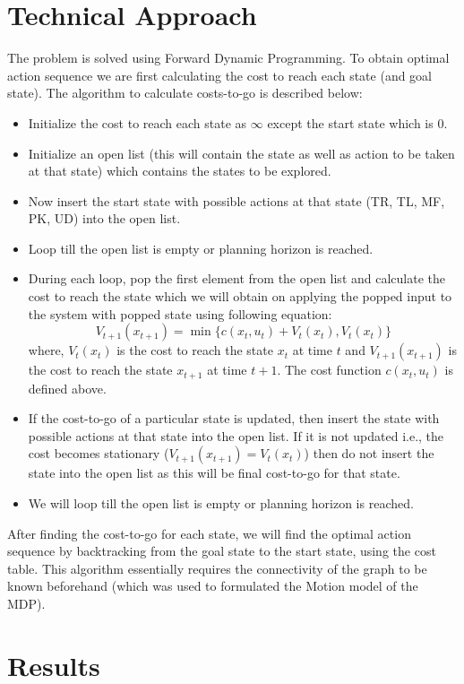 \documentclass[conference]{IEEEtran}
\begin{document}
\section{Technical Approach}
The problem is solved using Forward Dynamic Programming. To obtain optimal action sequence we are first calculating the cost to reach each state (and goal state). The algorithm to calculate costs-to-go is described below:
\begin{itemize}
\item Initialize the cost to reach each state as $\infty$ except the start state which is 0.
\item Initialize an open list (this will contain the state as well as action to be taken at that state) which contains the states to be explored.
\item Now insert the start state with possible actions at that state (TR, TL, MF, PK, UD) into the open list.
\item Loop till the open list is empty or planning horizon is reached.
\item During each loop, pop the first element from the open list and calculate the cost to reach the state which we will obtain on applying the popped input to the system with popped state using following equation:
\begin{equation*}
    V_{t+1}(x_{t+1}) = \min \{c(x_t, u_t) + V_t(x_t), V_t(x_t)\}
\end{equation*}
where, $V_t(x_t)$ is the cost to reach the state $x_t$ at time $t$ and $V_{t+1}(x_{t+1})$ is the cost to reach the state $x_{t+1}$ at time $t+1$. The cost function $c(x_t, u_t)$ is defined above.
\item If the cost-to-go of a particular state is updated, then insert the state with possible actions at that state into the open list. If it is not updated i.e., the cost becomes stationary ($V_{t+1}(x_{t+1})=V_t(x_t)$) then do not insert the state into the open list as this will be final cost-to-go for that state.
\item We will loop till the open list is empty or planning horizon is reached.
\end{itemize}
After finding the cost-to-go for each state, we will find the optimal action sequence by backtracking from the goal state to the start state, using the cost table. This algorithm essentially requires the connectivity of the graph to be known beforehand (which was used to formulated the Motion model of the MDP).

\section{Results}
\end{document}
